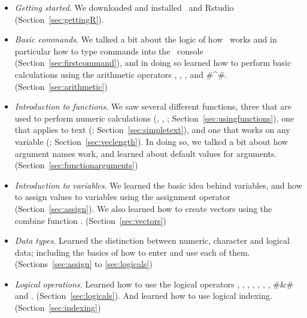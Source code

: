 \begin{itemize}
\item {\it Getting started}. We downloaded and installed \R\ and Rstudio (Section~\ref{sec:gettingR}).
\item {\it Basic commands}. We talked a bit about the logic of how \R\ works and in particular how to type commands into the \R\ console (Section~\ref{sec:firstcommand}), and in doing so learned how to perform basic calculations using the arithmetic operators \rtext{+}, \rtext{-}, \rtext{*}, \rtext{/} and \rtextverb#^#. (Section~\ref{sec:arithmetic})
\item {\it Introduction to functions}. We saw several different functions, three that are used to perform numeric calculations (, , ; Section~\ref{sec:usingfunctions}), one that applies to text (; Section~\ref{sec:simpletext}), and one that works on any variable (; Section~\ref{sec:veclength}). In doing so, we talked a bit about  how argument names work, and learned about default values for arguments. (Section~\ref{sec:functionarguments})
\item {\it Introduction to variables}. We learned the basic idea behind variables, and how to assign values to variables using the assignment operator \rtext{<-} (Section~\ref{sec:assign}). We also learned how to create vectors using the combine function . (Section~\ref{sec:vectors}) 
\item {\it Data types}. Learned the distinction between numeric, character and logical data; including the basics of how to enter and use each of them. (Sections~\ref{sec:assign} to \ref{sec:logicals})
\item {\it Logical operations}. Learned how to use the logical operators \rtext{==}, \rtext{!=}, \rtext{<}, \rtext{>}, \rtext{<=}, \rtext{=>}, \rtext{!}, \rtextverb#&# and \rtext{|}. (Section~\ref{sec:logicals}). And learned how to use logical indexing. (Section~\ref{sec:indexing})
\end{itemize}



